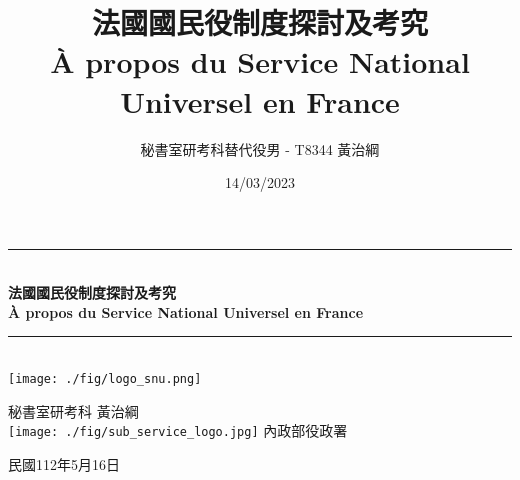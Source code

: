 \documentclass[a4paper,14pt]{extarticle}
\title{法國國民役制度探討及考究 \\ À propos du Service National Universel en France}
\author{秘書室研考科替代役男 - T8344 黃治綱}
\date{14/03/2023}
\theoremstyle{plain}
\theoremstyle{remark}
\numberwithin{equation}{section}
\newcommand{\HRule}{\rule{\linewidth}{0.5mm}}
\begin{document}
%


\begin{titlepage}
	\begin{center}



%

\HRule \\[0.4cm]
{ \Huge \bfseries 法國國民役制度探討及考究 }\\[0.4cm]
{ \huge \bfseries À propos du Service National Universel en France}\\[0.4cm]

\HRule \\[1.5cm]
	\texttt{[image: ./fig/logo\_snu.png]}

	\vspace{3cm}
{\Large
  秘書室研考科\hspace{0.2cm}  黃治綱
\\
\vspace{0.7cm}
\texttt{[image: ./fig/sub\_service\_logo.jpg]} 
內政部役政署
}
\vspace{0.5cm}

\vfill
{\Large 民國112年5月16日}

\end{center}
\end{titlepage}
\end{document}
